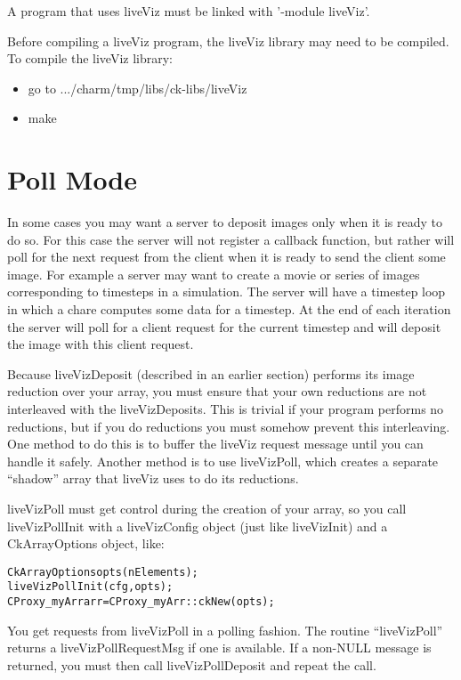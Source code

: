 A \charmpp{} program that uses liveViz must be linked with '-module liveViz'. 

Before compiling a liveViz program, the liveViz library may need to be compiled. 
To compile the liveViz library:
\begin{itemize}
\item go to .../charm/tmp/libs/ck-libs/liveViz
\item make
\end{itemize}


\section{Poll Mode}

In some cases you may want a server to deposit images only when it is ready to do so. 
For this case the server will not register a callback function, but rather will poll 
for the next request from the client when it is ready to send the client some image. 
For example a server may want to create a movie or series of images corresponding to 
timesteps in a simulation. The server will  have a timestep loop in which a chare computes 
some data for a timestep. At the end of each iteration the server will poll for a client 
request for the current timestep and will deposit the image with this client request.

Because liveVizDeposit (described in an earlier section) performs its image reduction over your array, 
you must ensure that your own reductions are not interleaved with the 
liveVizDeposits.  This is trivial if your program performs no reductions,
but if you do reductions you must somehow prevent this interleaving.
One method to do this is to buffer the liveViz request message until 
you can handle it safely.  Another method is to use liveVizPoll,
which creates a separate ``shadow'' array that liveViz uses to do
its reductions.

liveVizPoll must get control during the creation of your array,
so you call liveVizPollInit with a liveVizConfig object (just like
liveVizInit) and a CkArrayOptions object, like:

\begin{alltt}
        CkArrayOptions opts(nElements);
        liveVizPollInit(cfg,opts);
        CProxy_myArr arr=CProxy_myArr::ckNew(opts);
\end{alltt}

You get requests from liveVizPoll in a polling fashion.
The routine ``liveVizPoll'' returns a liveVizPollRequestMsg
if one is available.  If a non-NULL message is returned, you
must then call liveVizPollDeposit and repeat the call.

